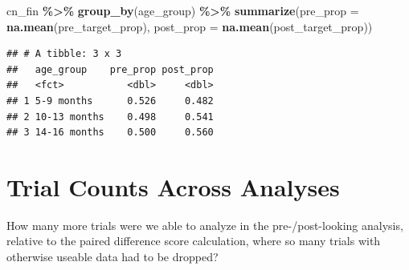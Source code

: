 \documentclass[
  doc,floatsintext]{apa6}
\newenvironment{Shaded}{\begin{snugshade}}{\end{snugshade}}
\newcommand{\AttributeTok}[1]{\textcolor[rgb]{0.13,0.29,0.53}{#1}}
\newcommand{\FunctionTok}[1]{\textcolor[rgb]{0.13,0.29,0.53}{\textbf{#1}}}
\newcommand{\NormalTok}[1]{#1}
\newcommand{\SpecialCharTok}[1]{\textcolor[rgb]{0.81,0.36,0.00}{\textbf{#1}}}
\begin{document}
\begin{Shaded}
\begin{Highlighting}[]
\NormalTok{cn\_fin }\SpecialCharTok{\%\textgreater{}\%}
  \FunctionTok{group\_by}\NormalTok{(age\_group) }\SpecialCharTok{\%\textgreater{}\%}
  \FunctionTok{summarize}\NormalTok{(}\AttributeTok{pre\_prop =} \FunctionTok{na.mean}\NormalTok{(pre\_target\_prop),}
            \AttributeTok{post\_prop =} \FunctionTok{na.mean}\NormalTok{(post\_target\_prop))}
\end{Highlighting}
\end{Shaded}

\begin{verbatim}
## # A tibble: 3 x 3
##   age_group    pre_prop post_prop
##   <fct>           <dbl>     <dbl>
## 1 5-9 months      0.526     0.482
## 2 10-13 months    0.498     0.541
## 3 14-16 months    0.500     0.560
\end{verbatim}

\section{Trial Counts Across Analyses}\label{trial-counts-across-analyses}

How many more trials were we able to analyze in the pre-/post-looking analysis,
relative to the paired difference score calculation, where so many trials with
otherwise useable data had to be dropped?
\end{document}
